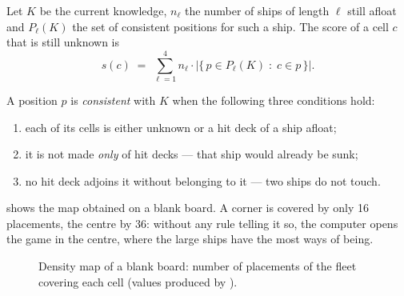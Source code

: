 Let $K$ be the current knowledge, $n_\ell$ the number of ships of length $\ell$ still afloat
and $P_\ell(K)$ the set of consistent positions for such a ship. The score of a cell $c$
that is still unknown is
\begin{equation}
    s(c) \;=\; \sum_{\ell = 1}^{4} n_\ell \cdot
    \bigl|\{\, p \in P_\ell(K) \;:\; c \in p \,\}\bigr| .
    \label{eq-densite}
\end{equation}

A position $p$ is \emph{consistent} with $K$ when the following three conditions hold:

\begin{enumerate}
    \item each of its cells is either unknown or a hit deck of a ship afloat;
    \item it is not made \emph{only} of hit decks --- that ship would already be sunk;
    \item no hit deck adjoins it without belonging to it --- two ships do not touch.
\end{enumerate}

 shows the map obtained on a blank board. A corner is covered by only 16
placements, the centre by 36: without any rule telling it so, the computer opens the game in
the centre, where the large ships have the most ways of being.

\begin{figure}[ht]
    \centering
    \caption{Density map of a blank board: number of placements of the fleet covering each
        cell (values produced by ).}
    \label{fig-densite}
\end{figure}

